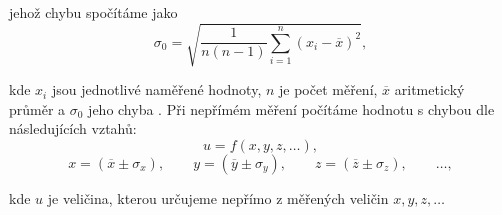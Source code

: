 \documentclass[english]{article}
\begin{document}
%	
	
	
	jehož chybu spočítáme jako 
	\begin{equation} \label{eq:chyba_aritmetickeho_prumeru}
	\sigma_0 = \sqrt{\frac{1}{n(n-1)} \sum\limits_{i=1}^{n}\left( x_i - \overline{x} \right)^2 },
	\end{equation}
	
	kde $ x_i $ jsou jednotlivé naměřené hodnoty, $ n $ je počet měření, $ \overline{x} $ aritmetický průměr a $ \sigma_0 $ jeho chyba \cite{bib:chyby}.
%	
Při nepřímém měření počítáme hodnotu s chybou dle následujících vztahů:
	\begin{equation}
	u = f(x, y, z, \ldots),
	\end{equation}
	\begin{displaymath}
	x = (\overline{x} \pm \sigma_x), \qquad
	y = (\overline{y} \pm \sigma_y), \qquad
	z = (\overline{z} \pm \sigma_z), \qquad
	\ldots,
	\end{displaymath}
	
	kde $ u $ je veličina, kterou určujeme nepřímo z měřených veličin $ x, y, z, \ldots $ 
	
\end{document}
